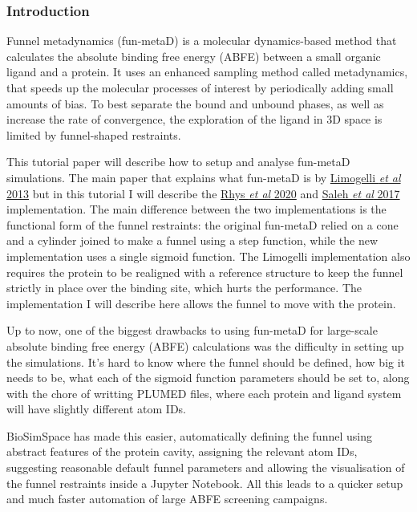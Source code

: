 \hypertarget{funnel-metadynamics-tutorial}{%
\label{funnel-metadynamics-tutorial}}
\hypertarget{Introduction}{%
\subsubsection{Introduction}\label{Introduction}}


Funnel metadynamics (fun-metaD) is a molecular dynamics-based method
that calculates the absolute binding free energy (ABFE) between a small
organic ligand and a protein. It uses an enhanced sampling method called
metadynamics, that speeds up the molecular processes of interest by
periodically adding small amounts of bias. To best separate the bound
and unbound phases, as well as increase the rate of convergence, the
exploration of the ligand in 3D space is limited by funnel-shaped
restraints.

This tutorial paper will describe how to setup and analyse fun-metaD
simulations. The main paper that explains what fun-metaD is by
\href{https://www.pnas.org/content/110/16/6358}{Limogelli \emph{et al}
2013} but in this tutorial I will describe the
\href{https://www.ncbi.nlm.nih.gov/pmc/articles/PMC7467642/}{Rhys
\emph{et al} 2020} and
\href{https://pubs.acs.org/doi/10.1021/acs.jcim.6b00772}{Saleh \emph{et
al} 2017} implementation. The main difference between the two
implementations is the functional form of the funnel restraints: the
original fun-metaD relied on a cone and a cylinder joined to make a
funnel using a step function, while the new implementation uses a single
sigmoid function. The Limogelli implementation also requires the protein
to be realigned with a reference structure to keep the funnel strictly
in place over the binding site, which hurts the performance. The
implementation I will describe here allows the funnel to move with the
protein.

Up to now, one of the biggest drawbacks to using fun-metaD for
large-scale absolute binding free energy (ABFE) calculations was the
difficulty in setting up the simulations. It's hard to know where the
funnel should be defined, how big it needs to be, what each of the
sigmoid function parameters should be set to, along with the chore of
writting PLUMED files, where each protein and ligand system will have
slightly different atom IDs.

BioSimSpace has made this easier, automatically defining the funnel
using abstract features of the protein cavity, assigning the relevant
atom IDs, suggesting reasonable default funnel parameters and allowing
the visualisation of the funnel restraints inside a Jupyter Notebook.
All this leads to a quicker setup and much faster automation of large
ABFE screening campaigns.

